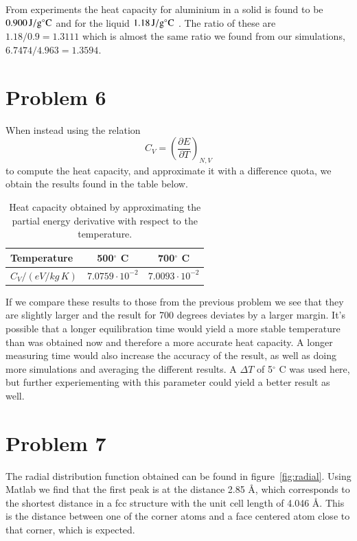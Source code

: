 From experiments the heat capacity for aluminium in a solid is found to be $\unit[0.900]{J/g^\circ C}$ \cite{al_heat_solid} and for the liquid $\unit[1.18]{J/g^\circ C}$ \cite{al_heat_liquid}. The ratio of these are $1.18/0.9=1.3111$ which is almost the same ratio we found from our simulations,
$6.7474/4.963=1.3594$.



\section*{Problem 6}

When instead using the relation
\begin{equation}
	C_V = \left( \frac{\partial E}{\partial T} \right)_{N,V}
\end{equation}
to compute the heat capacity, and approximate it with a difference quota, we obtain the results found in the table below.

\begin{table}[h!]
	\centering	
	\caption{Heat capacity obtained by approximating the partial energy derivative with respect to the temperature.}
	\begin{tabular}{l|cc}
		\hline \textbf{Temperature} & \textbf{500$^\circ$ C} & \textbf{700$^\circ$ C} \\ \hline
		$C_V / (\unit{eV/kg\,K})$ & $7.0759 \cdot 10^{-2}$ & $7.0093 \cdot 10^{-2}$ \\ \hline
	\end{tabular}
	\label{tab:prob6}
\end{table}

If we compare these results to those from the previous problem we see that they are slightly larger and the result for 700 degrees deviates by a larger margin. It's possible that a longer equilibration time would yield a more stable temperature than was obtained now and therefore a more accurate heat capacity. A longer measuring time would also increase the accuracy of the result, as well as doing more simulations and averaging the different results. A $\Delta T$ of 5$^\circ$ C was used here, but further experiementing with this parameter could yield a better result as well.

\section*{Problem 7}

The radial distribution function obtained can be found in figure~\ref{fig:radial}. Using Matlab we find that the first peak is at the distance 2.85 \r{A}, which corresponds to the shortest distance in a fcc structure with the unit cell length of 4.046 \r{A}. This is the distance between one of the corner atoms and a face centered atom close to that corner, which is expected.

